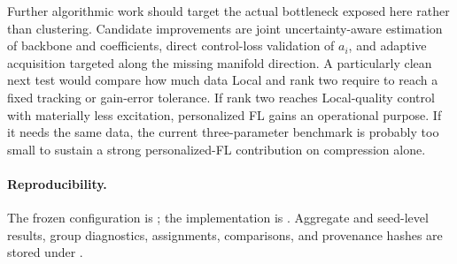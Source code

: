 Further algorithmic work should target the actual bottleneck exposed here rather
than clustering. Candidate improvements are joint uncertainty-aware estimation
of backbone and coefficients, direct control-loss validation of $a_i$, and
adaptive acquisition targeted along the missing manifold direction. A particularly
clean next test would compare how much data Local and rank two require to reach a
fixed tracking or gain-error tolerance. If rank two reaches Local-quality control
with materially less excitation, personalized FL gains an operational purpose.
If it needs the same data, the current three-parameter benchmark is probably too
small to sustain a strong personalized-FL contribution on compression alone.

\paragraph{Reproducibility.}
The frozen configuration is ; the implementation
is . Aggregate and
seed-level results, group diagnostics, assignments, comparisons, and provenance
hashes are stored under .
